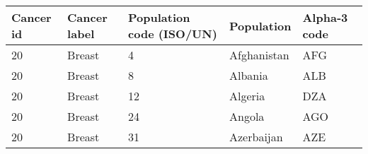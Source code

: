 \begin{tabular}{p{1.5cm}p{2cm}p{1.5cm}p{2.5cm}p{1.5cm}}
\toprule
Cancer id & Cancer label & Population code (ISO/UN) & Population & Alpha‑3 code \\
\midrule
20 & Breast & 4 & Afghanistan & AFG \\
20 & Breast & 8 & Albania & ALB \\
20 & Breast & 12 & Algeria & DZA \\
20 & Breast & 24 & Angola & AGO \\
20 & Breast & 31 & Azerbaijan & AZE \\
\bottomrule
\end{tabular} 